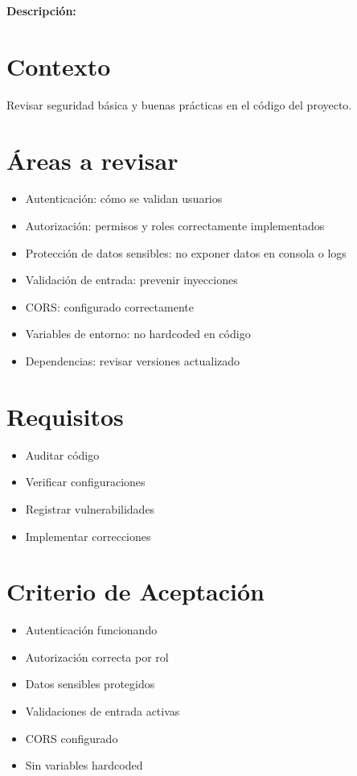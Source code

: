 \documentclass[
  spanish,
  11pt,
]{report}
\providecommand{\tightlist}{%
  \setlength{\itemsep}{0pt}\setlength{\parskip}{0pt}}
\begin{document}
\textbf{Descripción:}

\section{Contexto}\label{contexto-16}

Revisar seguridad básica y buenas prácticas en el código del proyecto.

\section{Áreas a revisar}\label{uxe1reas-a-revisar-2}

\begin{itemize}
\tightlist
\item
  Autenticación: cómo se validan usuarios
\item
  Autorización: permisos y roles correctamente implementados
\item
  Protección de datos sensibles: no exponer datos en consola o logs
\item
  Validación de entrada: prevenir inyecciones
\item
  CORS: configurado correctamente
\item
  Variables de entorno: no hardcoded en código
\item
  Dependencias: revisar versiones actualizado
\end{itemize}

\section{Requisitos}\label{requisitos-15}

\begin{itemize}
\tightlist
\item
  Auditar código
\item
  Verificar configuraciones
\item
  Registrar vulnerabilidades
\item
  Implementar correcciones
\end{itemize}

\section{Criterio de Aceptación}\label{criterio-de-aceptaciuxf3n-15}

\begin{itemize}
\tightlist
\item[$\square$]
  Autenticación funcionando
\item[$\square$]
  Autorización correcta por rol
\item[$\square$]
  Datos sensibles protegidos
\item[$\square$]
  Validaciones de entrada activas
\item[$\square$]
  CORS configurado
\item[$\square$]
  Sin variables hardcoded
\end{itemize}
\end{document}
